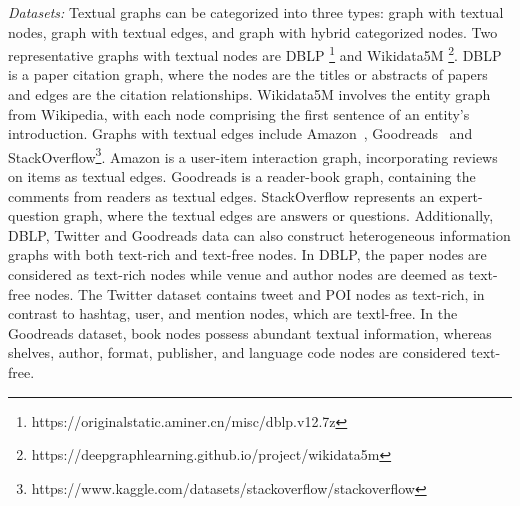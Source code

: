 \textit{Datasets:}
Textual graphs can be categorized into three types: graph with textual nodes, graph with textual edges, and graph with hybrid categorized nodes. Two representative graphs with textual nodes are DBLP \footnote{https://originalstatic.aminer.cn/misc/dblp.v12.7z} and Wikidata5M \footnote{https://deepgraphlearning.github.io/project/wikidata5m}. 
DBLP is a paper citation graph, 
where the nodes are the titles or abstracts of papers and edges are the citation relationships. 
Wikidata5M involves the entity graph from Wikipedia, with each node comprising the first sentence of an entity's introduction. Graphs with textual edges include Amazon~\cite{he2016ups}, Goodreads~\cite{wan2019fine} and StackOverflow\footnote{https://www.kaggle.com/datasets/stackoverflow/stackoverflow}. Amazon is a user-item interaction graph, incorporating reviews on items as textual edges. Goodreads is a reader-book graph, containing the comments from readers as textual edges. StackOverflow represents an expert-question graph, where the textual edges are answers or questions. Additionally, DBLP, Twitter and Goodreads data can also construct heterogeneous information graphs with both text-rich and text-free nodes. In DBLP, the paper nodes are considered as text-rich nodes while venue and author nodes are deemed as text-free nodes. The Twitter dataset contains tweet and POI nodes as text-rich, in contrast to hashtag, user, and mention nodes, which are textl-free. In the Goodreads dataset, book nodes possess abundant textual information, whereas shelves, author, format, publisher, and language code nodes are considered text-free.


